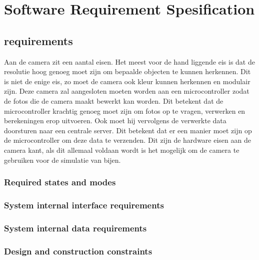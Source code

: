 \section{Software Requirement Spesification}

\subsection{requirements}
Aan de camera zit een aantal eisen. Het meest voor de hand liggende eis is dat de resolutie hoog genoeg moet zijn
om bepaalde objecten te kunnen herkennen. Dit is niet de enige eis, zo moet de camera ook kleur kunnen herkennen
en modulair zijn. Deze camera zal aangesloten moeten worden aan een microcontroller
zodat de fotos die de camera maakt bewerkt kan worden. Dit betekent dat de microcontroller krachtig genoeg moet zijn
om fotos op te vragen, verwerken en berekeningen erop uitvoeren. Ook moet hij vervolgens de verwerkte data doorsturen
naar een centrale server. Dit betekent dat er een manier moet zijn op de microcontroller om deze data te verzenden.
Dit zijn de hardware eisen aan de camera kant, als dit allemaal voldaan wordt is het mogelijk om de camera te
gebruiken voor de simulatie van bijen.

\subsubsection*{Required states and modes}

\subsubsection*{System internal interface requirements}

\subsubsection*{System internal data requirements}

\subsubsection*{Design and construction constraints}
